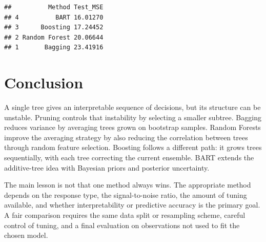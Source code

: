 \documentclass[
  11pt,
]{article}
\newenvironment{Shaded}{\begin{snugshade}}{\end{snugshade}}
\newcommand{\AttributeTok}[1]{\textcolor[rgb]{0.13,0.29,0.53}{#1}}
\newcommand{\FunctionTok}[1]{\textcolor[rgb]{0.13,0.29,0.53}{\textbf{#1}}}
\newcommand{\NormalTok}[1]{#1}
\newcommand{\OtherTok}[1]{\textcolor[rgb]{0.56,0.35,0.01}{#1}}
\newcommand{\SpecialCharTok}[1]{\textcolor[rgb]{0.81,0.36,0.00}{\textbf{#1}}}
\newcommand{\StringTok}[1]{\textcolor[rgb]{0.31,0.60,0.02}{#1}}
\begin{document}
\begin{Shaded}
\end{Shaded}

\begin{verbatim}
##          Method Test_MSE
## 4          BART 16.01270
## 3      Boosting 17.24452
## 2 Random Forest 20.06644
## 1       Bagging 23.41916
\end{verbatim}

\section{Conclusion}\label{conclusion}

A single tree gives an interpretable sequence of decisions, but its
structure can be unstable. Pruning controls that instability by
selecting a smaller subtree. Bagging reduces variance by averaging trees
grown on bootstrap samples. Random Forests improve the averaging
strategy by also reducing the correlation between trees through random
feature selection. Boosting follows a different path: it grows trees
sequentially, with each tree correcting the current ensemble. BART
extends the additive-tree idea with Bayesian priors and posterior
uncertainty.

The main lesson is not that one method always wins. The appropriate
method depends on the response type, the signal-to-noise ratio, the
amount of tuning available, and whether interpretability or predictive
accuracy is the primary goal. A fair comparison requires the same data
split or resampling scheme, careful control of tuning, and a final
evaluation on observations not used to fit the chosen model.
\end{document}

